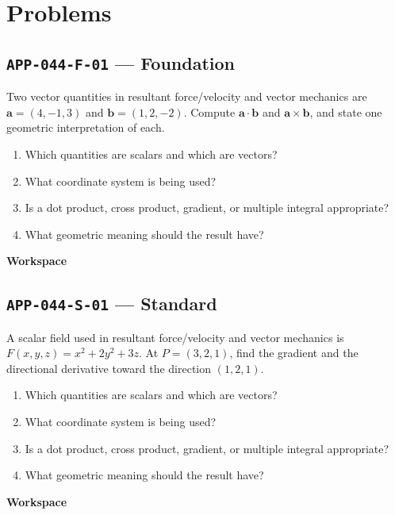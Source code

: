 \documentclass[11pt]{book}
\newcommand{\pid}[1]{\texttt{#1}}
\newcommand{\workspace}{\par\vspace{0.7in}\hrulefill\par\vspace{0.55in}\hrulefill\par}
\begin{document}
\section*{Problems}
\subsection*{\pid{APP-044-F-01} — Foundation}
\begin{problembox}
Two vector quantities in resultant force/velocity and vector mechanics are $\mathbf a=(4,-1,3)$ and $\mathbf b=(1,2,-2)$. Compute $\mathbf a\cdot\mathbf b$ and $\mathbf a\times\mathbf b$, and state one geometric interpretation of each.
\end{problembox}
\begin{promptbox}\begin{enumerate}
\item Which quantities are scalars and which are vectors?
\item What coordinate system is being used?
\item Is a dot product, cross product, gradient, or multiple integral appropriate?
\item What geometric meaning should the result have?
\end{enumerate}\end{promptbox}
\textbf{Workspace}\workspace
{}
\subsection*{\pid{APP-044-S-01} — Standard}
\begin{problembox}
A scalar field used in resultant force/velocity and vector mechanics is $F(x,y,z)=x^2+2y^2+3z$. At $P=(3,2,1)$, find the gradient and the directional derivative toward the direction $(1,2,1)$.
\end{problembox}
\begin{promptbox}\begin{enumerate}
\item Which quantities are scalars and which are vectors?
\item What coordinate system is being used?
\item Is a dot product, cross product, gradient, or multiple integral appropriate?
\item What geometric meaning should the result have?
\end{enumerate}\end{promptbox}
\textbf{Workspace}\workspace
{}
\end{document}
